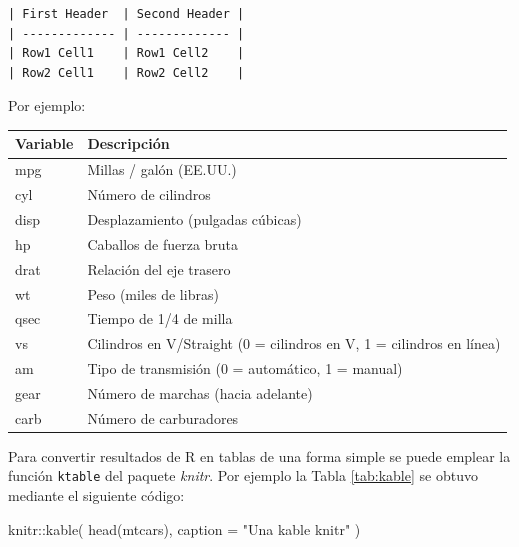 \documentclass[
]{book}
\newenvironment{Shaded}{\begin{snugshade}}{\end{snugshade}}
\newcommand{\AttributeTok}[1]{\textcolor[rgb]{0.77,0.63,0.00}{#1}}
\newcommand{\FunctionTok}[1]{\textcolor[rgb]{0.00,0.00,0.00}{#1}}
\newcommand{\NormalTok}[1]{#1}
\newcommand{\SpecialCharTok}[1]{\textcolor[rgb]{0.00,0.00,0.00}{#1}}
\newcommand{\StringTok}[1]{\textcolor[rgb]{0.31,0.60,0.02}{#1}}
\theoremstyle{break}
\theoremstyle{nonumberplain}
\begin{document}
\begin{verbatim}
| First Header  | Second Header |
| ------------- | ------------- |
| Row1 Cell1    | Row1 Cell2    |
| Row2 Cell1    | Row2 Cell2    |
\end{verbatim}

Por ejemplo:

\begin{longtable}[]{@{}ll@{}}
\toprule
Variable & Descripción \\
\midrule
\endhead
mpg & Millas / galón (EE.UU.) \\
cyl & Número de cilindros \\
disp & Desplazamiento (pulgadas cúbicas) \\
hp & Caballos de fuerza bruta \\
drat & Relación del eje trasero \\
wt & Peso (miles de libras) \\
qsec & Tiempo de 1/4 de milla \\
vs & Cilindros en V/Straight (0 = cilindros en V, 1 = cilindros en línea) \\
am & Tipo de transmisión (0 = automático, 1 = manual) \\
gear & Número de marchas (hacia adelante) \\
carb & Número de carburadores \\
\bottomrule
\end{longtable}

Para convertir resultados de R en tablas de una forma simple se puede emplear la función \texttt{ktable} del paquete \emph{knitr}. Por ejemplo la Tabla \ref{tab:kable} se obtuvo mediante el siguiente código:

\begin{Shaded}
\begin{Highlighting}[]
\NormalTok{knitr}\SpecialCharTok{::}\FunctionTok{kable}\NormalTok{(}
  \FunctionTok{head}\NormalTok{(mtcars), }
  \AttributeTok{caption =} \StringTok{"Una kable knitr"}
\NormalTok{)}
\end{Highlighting}
\end{Shaded}
\end{document}
